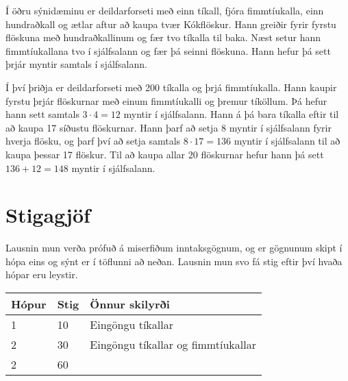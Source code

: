 Í öðru sýnidæminu er deildarforseti með einn tíkall, fjóra fimmtíukalla, einn
hundraðkall og ætlar aftur að kaupa tvær Kókflöskur. Hann greiðir fyrir
fyrstu flöskuna með hundraðkallinum og fær tvo tíkalla til baka. Næst setur hann
fimmtíukallana tvo í sjálfsalann og fær þá seinni flöskuna. Hann hefur þá sett
þrjár myntir samtals í sjálfsalann.

Í því þriðja er deildarforseti með 200 tíkalla og þrjá fimmtíukalla. Hann
kaupir fyrstu þrjár flöskurnar með einum fimmtíukalli og þremur tíköllum. Þá
hefur hann sett samtals $3 \cdot 4 = 12$ myntir í sjálfsalann. Hann á þá bara
tíkalla eftir til að kaupa 17 síðustu flöskurnar. Hann þarf að setja 8 myntir í
sjálfsalann fyrir hverja flösku, og þarf því að setja samtals $8 \cdot 17 =
136$ myntir í sjálfsalann til að kaupa þessar 17 flöskur. Til að kaupa allar 20
flöskurnar hefur hann þá sett $136 + 12 = 148$ myntir í sjálfsalann.

\section*{Stigagjöf}
Lausnin mun verða prófuð á miserfiðum inntaksgögnum, og er gögnunum skipt í
hópa eins og sýnt er í töflunni að neðan. Lausnin mun svo fá stig eftir því
hvaða hópar eru leystir.

\begin{tabular}{|l|l|l|}
\hline
Hópur & Stig & Önnur skilyrði \\ \hline
1        & 10   & Eingöngu tíkallar \\ \hline
2        & 30   & Eingöngu tíkallar og fimmtíukallar \\ \hline
2        & 60   &  \\ \hline
\end{tabular}
